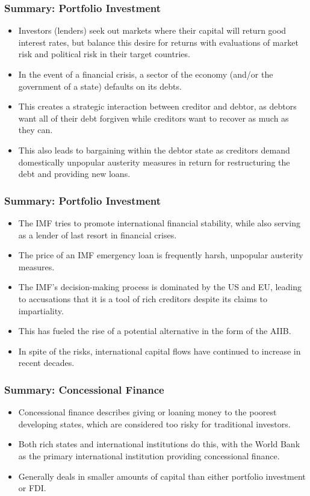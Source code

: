 \documentclass{beamer}
\begin{document}
\begin{frame} 
\frametitle{\LARGE{Summary: Portfolio Investment}}
\begin{itemize}
	\item Investors (lenders) seek out markets where their capital will return good interest rates, but balance this desire for returns with evaluations of market risk and political risk in their target countries.
	\item In the event of a financial crisis, a sector of the economy (and/or the government of a state) defaults on its debts. \pause
	\item This creates a strategic interaction between creditor and debtor, as debtors want all of their debt forgiven while creditors want to recover as much as they can. \pause
	\item This also leads to bargaining within the debtor state as creditors demand domestically unpopular austerity measures in return for restructuring the debt and providing new loans.
\end{itemize}
\end{frame}

\begin{frame} 
\frametitle{\LARGE{Summary: Portfolio Investment}}
\begin{itemize}
	\item The IMF tries to promote international financial stability, while also serving as a lender of last resort in financial crises. \pause
	\item The price of an IMF emergency loan is frequently harsh, unpopular austerity measures. \pause
	\item The IMF's decision-making process is dominated by the US and EU, leading to accusations that it is a tool of rich creditors despite its claims to impartiality.\pause
	\item This has fueled the rise of a potential alternative in the form of the AIIB. \pause
	\item In spite of the risks, international capital flows have continued to increase in recent decades.
\end{itemize}
\end{frame}

\begin{frame} 
	\frametitle{\LARGE{Summary: Concessional Finance}}
	\begin{itemize}
		\item Concessional finance describes giving or loaning money to the poorest developing states, which are considered too risky for traditional investors.
		\item Both rich states and international institutions do this, with the World Bank as the primary international institution providing concessional finance. \pause
		\item Generally deals in smaller amounts of capital than either portfolio investment or FDI. 	
	\end{itemize}
\end{frame}
\end{document}
